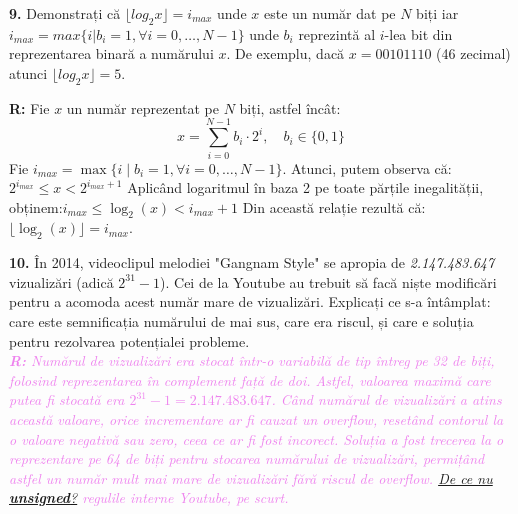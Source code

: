\documentclass[a4paper]{article}
\newcommand{\hl}[1]{\textcolor{violet}{\textit{#1}}}
\newenvironment{definition}[1]
    {\begin{definitionbox}[frametitle={#1}]}
    {\end{definitionbox}}
\begin{document}
\textbf{9.} Demonstrați că $\lfloor log_{2}x \rfloor = i_{max}$ unde $x$ este un număr dat pe $N$ biți iar $i_{max} = max\{i | b_{i} = 1, \forall i = 0,\dots,N-1 \}$ unde $b_{i}$ reprezintă al $i$-lea bit din reprezentarea binară a numărului $x$. De exemplu, dacă $x = 00101110$ (46 zecimal) atunci $\lfloor log_{2}x \rfloor = 5$.
\begin{definition}{}
\textbf{R:} Fie $x$ un număr reprezentat pe $N$ biți, astfel încât:
\[x = \sum_{i=0}^{N-1} b_i \cdot 2^i, \quad b_i \in \{0, 1\}\]
Fie $i_{max} = \max\{i \mid b_i = 1, \forall i = 0, \dots, N-1\}$. Atunci, putem observa că: $2^{i_{max}} \leq x < 2^{i_{max} + 1}$
Aplicând logaritmul în baza 2 pe toate părțile inegalității, obținem:$i_{max} \leq \log_2(x) < i_{max} + 1$
Din această relație rezultă că:$\lfloor \log_2(x) \rfloor = i_{max}$.
\leavevmode
\end{definition}
\vspace{0.5cm}

\textbf{10.} În 2014, videoclipul melodiei "Gangnam Style" se apropia de \textit{2.147.483.647} vizualizări (adică $2^{31} - 1$). Cei de la Youtube au trebuit să facă niște modificări pentru a acomoda acest număr mare de vizualizări. Explicați ce s-a întâmplat: care este semnificația numărului de mai sus, care era riscul, și care e soluția pentru rezolvarea potențialei probleme. \\ \hl{\textbf{R:} Numărul de vizualizări era stocat într-o variabilă de tip întreg pe 32 de biți, folosind reprezentarea în complement față de doi. Astfel, valoarea maximă care putea fi stocată era $2^{31} - 1 = 2.147.483.647$. Când numărul de vizualizări a atins această valoare, orice incrementare ar fi cauzat un overflow, resetând contorul la o valoare negativă sau zero, ceea ce ar fi fost incorect. Soluția a fost trecerea la o reprezentare pe 64 de biți pentru stocarea numărului de vizualizări, permițând astfel un număr mult mai mare de vizualizări fără riscul de overflow. \href{https://stackoverflow.com/questions/27275150/advice-on-unsigned-int-gangnam-style-edition}{De ce nu \textbf{unsigned}?} regulile interne Youtube, pe scurt.}
\vspace{0.5cm}
\end{document}
